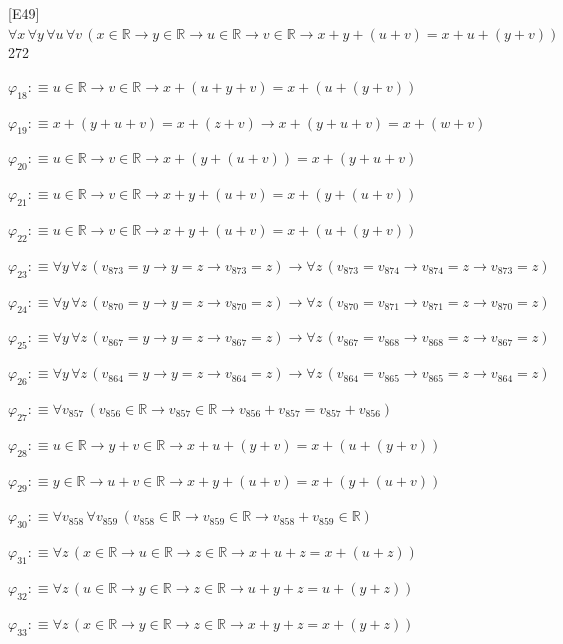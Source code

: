 \begin{fullproof}{[E49]}{$\forall x\,\forall y\,\forall u\,\forall v\,(x \in \mathbb{R} \to y \in \mathbb{R} \to u \in \mathbb{R} \to v \in \mathbb{R} \to x + y + (u + v) = x + u + (y + v))$}{272}
\begin{abbrevlist}
\item $\varphi_{18} :\equiv u \in \mathbb{R} \to v \in \mathbb{R} \to x + (u + y + v) = x + (u + (y + v))$
\item $\varphi_{19} :\equiv x + (y + u + v) = x + (z + v) \to x + (y + u + v) = x + (w + v)$
\item $\varphi_{20} :\equiv u \in \mathbb{R} \to v \in \mathbb{R} \to x + (y + (u + v)) = x + (y + u + v)$
\item $\varphi_{21} :\equiv u \in \mathbb{R} \to v \in \mathbb{R} \to x + y + (u + v) = x + (y + (u + v))$
\item $\varphi_{22} :\equiv u \in \mathbb{R} \to v \in \mathbb{R} \to x + y + (u + v) = x + (u + (y + v))$
\item $\varphi_{23} :\equiv \forall y\,\forall z\,(v_{873} = y \to y = z \to v_{873} = z) \to \forall z\,(v_{873} = v_{874} \to v_{874} = z \to v_{873} = z)$
\item $\varphi_{24} :\equiv \forall y\,\forall z\,(v_{870} = y \to y = z \to v_{870} = z) \to \forall z\,(v_{870} = v_{871} \to v_{871} = z \to v_{870} = z)$
\item $\varphi_{25} :\equiv \forall y\,\forall z\,(v_{867} = y \to y = z \to v_{867} = z) \to \forall z\,(v_{867} = v_{868} \to v_{868} = z \to v_{867} = z)$
\item $\varphi_{26} :\equiv \forall y\,\forall z\,(v_{864} = y \to y = z \to v_{864} = z) \to \forall z\,(v_{864} = v_{865} \to v_{865} = z \to v_{864} = z)$
\item $\varphi_{27} :\equiv \forall v_{857}\,(v_{856} \in \mathbb{R} \to v_{857} \in \mathbb{R} \to v_{856} + v_{857} = v_{857} + v_{856})$
\item $\varphi_{28} :\equiv u \in \mathbb{R} \to y + v \in \mathbb{R} \to x + u + (y + v) = x + (u + (y + v))$
\item $\varphi_{29} :\equiv y \in \mathbb{R} \to u + v \in \mathbb{R} \to x + y + (u + v) = x + (y + (u + v))$
\item $\varphi_{30} :\equiv \forall v_{858}\,\forall v_{859}\,(v_{858} \in \mathbb{R} \to v_{859} \in \mathbb{R} \to v_{858} + v_{859} \in \mathbb{R})$
\item $\varphi_{31} :\equiv \forall z\,(x \in \mathbb{R} \to u \in \mathbb{R} \to z \in \mathbb{R} \to x + u + z = x + (u + z))$
\item $\varphi_{32} :\equiv \forall z\,(u \in \mathbb{R} \to y \in \mathbb{R} \to z \in \mathbb{R} \to u + y + z = u + (y + z))$
\item $\varphi_{33} :\equiv \forall z\,(x \in \mathbb{R} \to y \in \mathbb{R} \to z \in \mathbb{R} \to x + y + z = x + (y + z))$

\end{abbrevlist}
\end{fullproof}
